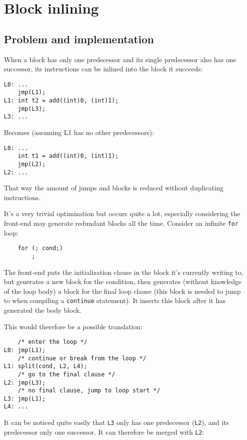 \documentclass[12pt, a4paper]{article}
\begin{document}
\section{Block inlining}
\subsection{Problem and implementation}
When a block has only one predecessor and its single predecessor
also has one successor, its instructions can be inlined into the block it succeeds:

\begin{lstlisting}
L0:	...
	jmp(L1);
L1:	int t2 = add((int)0, (int)1);
	jmp(L3);
L3:	...
\end{lstlisting}

Becomes (assuming L1 has no other predecessors):

\begin{lstlisting}
L0:	...
	int t1 = add((int)0, (int)1);
	jmp(L2);
L2:	...
\end{lstlisting}

That way the amount of jumps and blocks is reduced without duplicating instructions.

It's a very trivial optimization but occurs quite a lot, especially considering
the front-end may generate redundant blocks all the time. Consider an infinite
\verb+for+ loop:

\begin{lstlisting}
	for (; cond;)
		;
\end{lstlisting}

The front-end puts the initialization clause in the block it's currently writing
to, but generates a new block for the condition, then generates (without knowledge
of the loop body) a block for the final loop clause (this block is needed to jump
to when compiling a \verb+continue+ statement). It inserts this block after
it has generated the body block.

This would therefore be a possible translation:

\begin{lstlisting}
	/* enter the loop */
L0:	jmp(L1);
	/* continue or break from the loop */
L1:	split(cond, L2, L4);
	/* go to the final clause */
L2:	jmp(L3);
	/* no final clause, jump to loop start */
L3:	jmp(L1);
L4:	...
\end{lstlisting}

It can be noticed quite easily that \verb+L3+ only has one predecessor (\verb+L2+), and its
predecessor only one successor. It can therefore be merged with \verb+L2+:
\end{document}
